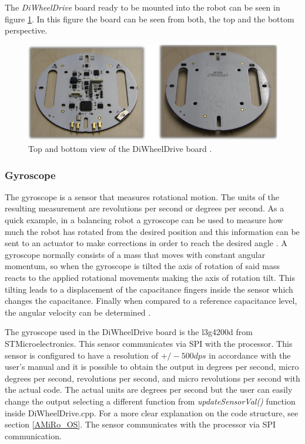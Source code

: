 \documentclass[12pt]{report}%
\begin{document}
The \textit{DiWheelDrive} board ready to be mounted into the robot can be seen in figure \ref{fig:diwheel}. In this figure the board can be seen from both, the top and the bottom perspective.

\begin{figure}[ht]
	\centering
	\includegraphics[width=\textwidth]{DiWheel_real}
    \caption{Top and bottom view of the DiWheelDrive board \cite{AMiRo_ppt_v1}.}
    \label{fig:diwheel}
\end{figure}
\clearpage

\subsubsection{Gyroscope}
The gyroscope is a sensor that measures rotational motion. The units of the resulting measurement are revolutions per second or degrees per second. As a quick example, in a balancing robot a gyroscope can be used to measure how much the robot has rotated from the desired position and this information can be sent to an actuator to make corrections in order to reach the desired angle \cite{gyrostheory}. A gyroscope normally consists of a mass that moves with constant angular momentum, so when the gyroscope is tilted the axis of rotation of said mass reacts to the applied rotational movements making the axis of rotation tilt. This tilting leads to a displacement of the capacitance fingers inside the sensor which changes the capacitance. Finally when compared to a reference capacitance level, the angular velocity can be determined \cite{AMiRo_ppt_v1}.

The gyroscope used in the DiWheelDrive board is the l3g4200d from STMicroelectronics. This sensor communicates via SPI with the processor. This sensor is configured to have a resolution of $+/-500 dps$ in accordance with the user's manual \cite{gyroscopepart} and it is possible to obtain the output in degrees per second, micro degrees per second, revolutions per second, and micro revolutions per second with the actual code. The actual units are degrees per second but the user can easily change the output selecting a different function from \textit{updateSensorVal()} function inside DiWheelDrive.cpp. For a more clear explanation on the code structure, see section \ref{AMiRo_OS}. The sensor communicates with the processor via SPI communication.
\end{document}
